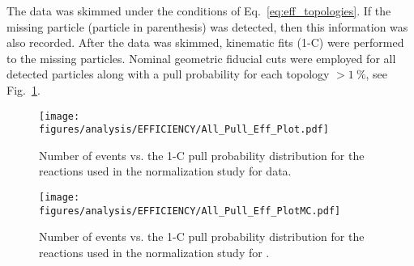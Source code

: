 The data was skimmed under the conditions of Eq.~\ref{eq:eff_topologies}. If the missing particle (particle in parenthesis) was detected, then this information was also recorded. After the data was skimmed, kinematic fits (1-C) were performed to the missing particles. Nominal geometric fiducial cuts were employed for all detected particles along with a pull probability for each topology  $>1~\%$, see Fig.~\ref{fig:eff_pull}.
\begin{figure}[h!]\begin{center}
\texttt{[image: \\figures/analysis/EFFICIENCY/All\_Pull\_Eff\_Plot.pdf]}
\caption[Number of events vs. the pull distribution for the reactions used in the normalization study for data]{\label{fig:eff_pull}Number of events vs. the 1-C pull probability distribution for the reactions used in the normalization study for data.}
\end{center}\end{figure}
\begin{figure}[h!]\begin{center}
\texttt{[image: \\figures/analysis/EFFICIENCY/All\_Pull\_Eff\_PlotMC.pdf]}
\caption[Number of events vs. the pull distribution for the reactions used in the normalization study for ]{\label{fig:eff_pullMC} Number of events vs. the 1-C pull probability distribution for the reactions used in the normalization study for .}
\end{center}\end{figure}


